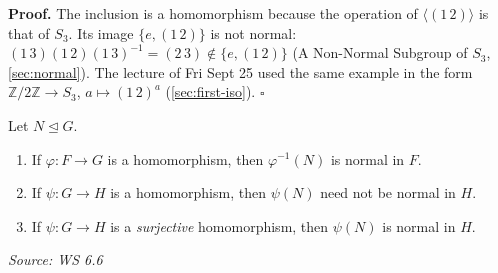 \documentclass[11pt]{report}
\renewenvironment{proof}[1][Proof]{\noindent\textbf{#1.} }{\hfill$\square$\par\vspace{5pt}}
\newcommand{\srcline}[1]{\par\hfill{\footnotesize\textit{Source: #1}}}
\begin{document}
\begin{proof}
The inclusion is a homomorphism because the operation of $\langle (1\,2) \rangle$ is that of $S_3$. Its image $\{e, (1\,2)\}$ is not normal: $(1\,3)(1\,2)(1\,3)^{-1} = (2\,3) \notin \{e, (1\,2)\}$ (A Non-Normal Subgroup of $S_3$, \ref{sec:normal}). The lecture of Fri Sept 25 used the same example in the form $\mathbb{Z}/2\mathbb{Z} \to S_3$, $a \mapsto (1\,2)^a$ (\ref{sec:first-iso}).
\end{proof}

\begin{propbox}\label{prop:preimages-images-normal-subgroups}
Let $N \trianglelefteq G$.
\begin{enumerate}
    \item If $\varphi: F \to G$ is a homomorphism, then $\varphi^{-1}(N)$ is normal in $F$.
    \item If $\psi: G \to H$ is a homomorphism, then $\psi(N)$ need not be normal in $H$.
    \item If $\psi: G \to H$ is a \emph{surjective} homomorphism, then $\psi(N)$ is normal in $H$.
\end{enumerate}
\srcline{WS 6.6}
\end{propbox}
\end{document}
